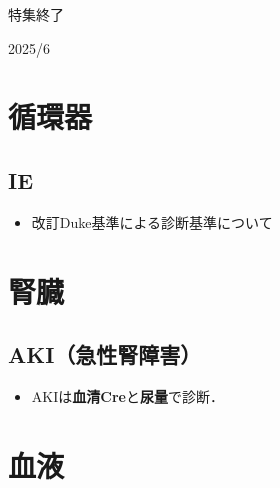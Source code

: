 

特集終了

2025/6


\section{循環器}
\subsection{IE}
\begin{itemize}

\item 改訂Duke基準による診断基準について
\end{itemize}


\section{腎臓}

\subsection{AKI（急性腎障害）}
\begin{itemize}
\item AKIは\textbf{血清Cre}と\textbf{尿量}で診断．


\end{itemize}

\section{血液}

